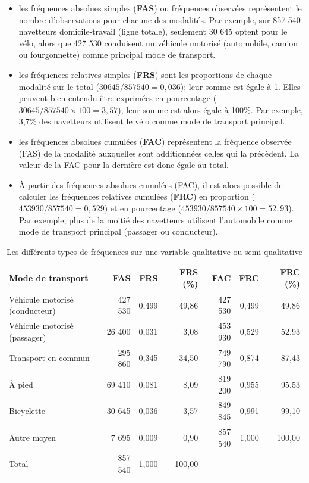 \documentclass[
  11pt,
  french,
]{book}
\begin{document}
\begin{itemize}
\item
  les fréquences absolues simples (\textbf{FAS}) ou fréquences observées représentent le nombre d'observations pour chacune des modalités. Par exemple, sur 857 540 navetteurs domicile-travail (ligne totale), seulement 30 645 optent pour le vélo, alors que 427 530 conduisent un véhicule motorisé (automobile, camion ou fourgonnette) comme principal mode de transport.
\item
  les fréquences relatives simples (\textbf{FRS}) sont les proportions de chaque modalité sur le total (\(30645/857540=0,036\)); leur somme est égale à 1. Elles peuvent bien entendu être exprimées en pourcentage (\(30645/857540 \times 100=3,57\)); leur somme est alors égale à 100\%. Par exemple, 3,7\% des navetteurs utilisent le vélo comme mode de transport principal.
\item
  les fréquences absolues cumulées (\textbf{FAC}) représentent la fréquence observée (FAS) de la modalité auxquelles sont additionnées celles qui la précèdent. La valeur de la FAC pour la dernière est donc égale au total.
\item
  À partir des fréquences absolues cumulées (FAC), il est alors possible de calculer les fréquences relatives cumulées (\textbf{FRC}) en proportion (\(453930 / 857540 = 0,529\)) et en pourcentage (\(453930 / 857540 \times 100= 52,93\)). Par exemple, plus de la moitié des navetteurs utilisent l'automobile comme mode de transport principal (passager ou conducteur).
\end{itemize}

\begin{table}

\caption{\label{tab:Frequences}Les différents types de fréquences sur une variable qualitative ou semi-qualitative}
\centering
\fontsize{8}{10}\selectfont
\begin{tabular}[t]{lrrrrrr}
\toprule
Mode de transport & FAS & FRS & FRS (\%) & FAC & FRC & FRC (\%)\\
\midrule
Véhicule motorisé (conducteur) & 427 530 & 0,499 & 49,86 & 427 530 & 0,499 & 49,86\\
Véhicule motorisé (passager) & 26 400 & 0,031 & 3,08 & 453 930 & 0,529 & 52,93\\
Transport en commun & 295 860 & 0,345 & 34,50 & 749 790 & 0,874 & 87,43\\
À pied & 69 410 & 0,081 & 8,09 & 819 200 & 0,955 & 95,53\\
Bicyclette & 30 645 & 0,036 & 3,57 & 849 845 & 0,991 & 99,10\\
\addlinespace
Autre moyen & 7 695 & 0,009 & 0,90 & 857 540 & 1,000 & 100,00\\
Total & 857 540 & 1,000 & 100,00 &  &  & \\
\bottomrule
\end{tabular}
\end{table}
\end{document}
